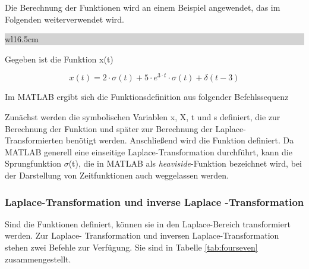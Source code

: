 \noindent Die Berechnung der Funktionen wird an einem Beispiel angewendet, das im Folgenden weiterverwendet wird.

\clearpage

\noindent
\colorbox{lightgray}{%
%
\renewcommand\arraystretch{0.6}%
\begin{tabular}{ wl{16.5cm} }
{\selectfont{Beispiel: Funktionsdefinition} }
\end{tabular}%
}\bigskip

\noindent Gegeben ist die Funktion x(t)

\begin{equation}\label{eq:fourhundredsfiftyfive}
x(t)=2\cdot \sigma (t)+5\cdot e^{3\cdot t} \cdot \sigma (t)+\delta (t-3)
\end{equation}

\noindent Im MATLAB ergibt sich die Funktionsdefinition aus folgender Befehlssequenz



\noindent Zun\"{a}chst werden die symbolischen Variablen x, X, t und s definiert, die zur Berechnung der Funktion und sp\"{a}ter zur Berechnung der Laplace-Transformierten ben\"{o}tigt werden. Anschlie{\ss}end wird die Funktion definiert. Da MATLAB generell eine einseitige Laplace-Transformation durchf\"{u}hrt, kann die Sprungfunktion $\sigma$(t), die in MATLAB als \textit{heaviside}-Funktion bezeichnet wird, bei der Darstellung von Zeitfunktionen auch weggelassen werden. 

\subsubsection{Laplace-Transformation und inverse Laplace -Transformation}

\noindent Sind die Funktionen definiert, können sie in den Laplace-Bereich transformiert werden. Zur Laplace-
Transformation und inversen Laplace-Transformation stehen zwei Befehle zur Verfügung. Sie sind in
Tabelle \ref{tab:fourseven} zusammengestellt.

